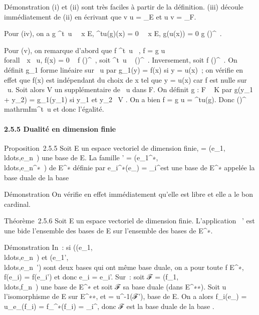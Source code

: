 \documentclass[]{article}
\begin{document}
Démonstration (i) et (ii) sont très faciles à partir de la définition.
(iii) découle immédiatement de (ii) en écrivant que v \cdot u =
\mathrmId\_E et u \cdot v =
\mathrmId\_F.

Pour (iv), on a g
\in\mathrmKer^t~u
\Leftrightarrow \forall~~x \in E,
^tu(g)(x) = 0 \Leftrightarrow
\forall~~x \in E, g(u(x)) = 0
\Leftrightarrow g \in
(\mathrmImu)^\bot~.

Pour (v), on remarque d'abord que f
\in\mathrmIm^t~u
\rigtharrow~\existsg, f = g \cdot u \rigtharrow~\\forall~~x
\in\mathrmKer~u, f(x) = 0 \rigtharrow~ f
\in
(\mathrmKeru)^\bot~,
soit
\mathrmIm^t~u \subset~
(\mathrmKeru)^\bot~.
Inversement, soit f \in
(\mathrmKeru)^\bot~.
On définit g\_1 forme linéaire sur
\mathrmIm~u par
g\_1(y) = f(x) si y = u(x)~; on vérifie en effet que f(x) est
indépendant du choix de x tel que y = u(x) car f est nulle sur
\mathrmKer~u. Soit alors V
un supplémentaire de
\mathrmIm~u dans F. On
définit g : F \rightarrow~ K par g(y\_1 + y\_2) =
g\_1(y\_1) si y\_1
\in\mathrmImu et y\_2~
\in V . On a bien f = g \cdot u = ^tu(g). Donc
(\mathrmKeru)^\bot\subset~\\mathrmIm^t~u
et donc l'égalité.

\paragraph{2.5.5 Dualité en dimension finie}

Proposition~2.5.5 Soit E un espace vectoriel de dimension finie,  =
(e\_1,\\ldots,e\_n~)
une base de E. La famille ' =
(e\_1^∗,\\ldots,e\_n^∗~)
de E^∗ définie par e\_i^∗(e\_\jmath) =
\delta\_i^\jmath est une base de E^∗ appelée la base
duale de la base 

Démonstration On vérifie en effet immédiatement qu'elle est libre et
elle a le bon cardinal.

Théorème~2.5.6 Soit E un espace vectoriel de dimension finie.
L'application \rightarrow~' est une bi\jmathection de l'ensemble des bases de E sur
l'ensemble des bases de E^∗.

Démonstration In~: si
((e\_1,\\ldots,e\_n~)
et
(e\_1',\\ldots,e\_n~')
sont deux bases qui ont même base duale, on a pour toute f \in
E^∗, f(e\_i) = f(e\_i') et donc e\_i
= e\_i'. Sur~: soit ℱ =
(f\_1,\\ldots,f\_n~)
une base de E^∗ et soit ℱ sa base duale (dans
E^∗∗). Soit u l'isomorphisme de E sur E^∗∗, et  =
u^-1(ℱ'), base de E. On a alors f\_i(e\_\jmath) =
u\_e\_\jmath(f\_i) =
f\_\jmath^∗(f\_i) = \delta\_i^\jmath, donc ℱ est
la base duale de la base .
\end{document}

